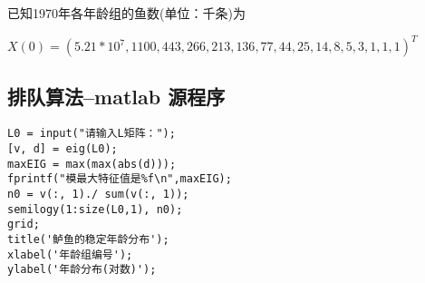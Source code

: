 \documentclass[experiment, printoneside]{seucoursepaper} %
\begin{document}
已知1970年各年龄组的鱼数(单位：千条)为
\begin{center}
    $X(0)=(5.21*10^7,1100,443,266,213,136,77,44,25,14,8,5,3,1,1,1)^T$
\end{center}

\newpage
\begin{appendices}
\section{排队算法--matlab 源程序}
\begin{lstlisting}[basicstyle=\small\sarasa]
% 由Leslie矩阵求解其模最大特征值 和 稳定年龄分布向量
L0 = input("请输入L矩阵：");
[v, d] = eig(L0);
maxEIG = max(max(abs(d)));
fprintf("模最大特征值是%f\n",maxEIG);
n0 = v(:, 1)./ sum(v(:, 1));
semilogy(1:size(L0,1), n0);
grid;
title('鲈鱼的稳定年龄分布');
xlabel('年龄组编号');
ylabel('年龄分布(对数)');
\end{lstlisting}    
\end{appendices}

\printindex %
\end{document}
